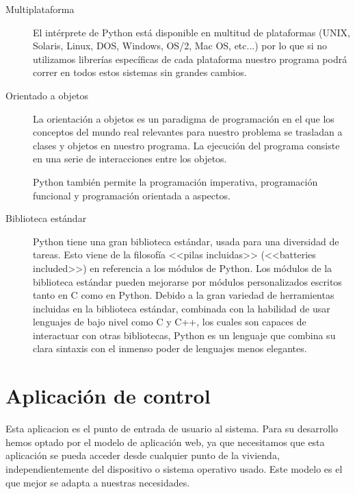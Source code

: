 \begin{description}
     \item[Multiplataforma] El intérprete de Python está disponible en multitud de plataformas (UNIX, Solaris, Linux, DOS, Windows, OS/2, Mac OS, etc...) por lo que si no utilizamos librerías específicas de cada plataforma nuestro programa podrá correr en todos estos sistemas sin grandes cambios.
     
     \item[Orientado a objetos] La orientación a objetos es un paradigma de programación en el que los conceptos del mundo real relevantes para nuestro problema se trasladan a clases y objetos en nuestro programa. La ejecución del programa consiste en una serie de interacciones entre los objetos.
     
     Python también permite la programación imperativa, programación funcional y programación orientada a aspectos.
     
     \item[Biblioteca estándar] Python tiene una gran biblioteca estándar, usada para una diversidad de tareas. Esto viene de la filosofía <<pilas incluidas>> (<<batteries included>>) en referencia a los módulos de Python. Los módulos de la biblioteca estándar pueden mejorarse por módulos personalizados escritos tanto en C como en Python. Debido a la gran variedad de herramientas incluidas en la biblioteca estándar, combinada con la habilidad de usar lenguajes de bajo nivel como C y C++, los cuales son capaces de interactuar con otras bibliotecas, Python es un lenguaje que combina su clara sintaxis con el inmenso poder de lenguajes menos elegantes.
    \end{description}
    
\section{Aplicación de control}
Esta aplicacion es el punto de entrada de usuario al sistema. Para su desarrollo hemos optado por el modelo de aplicación web, ya que necesitamos que esta aplicación se pueda acceder desde cualquier punto de la vivienda, independientemente del dispositivo o sistema operativo usado. Este modelo es el que mejor se adapta a nuestras necesidades.

